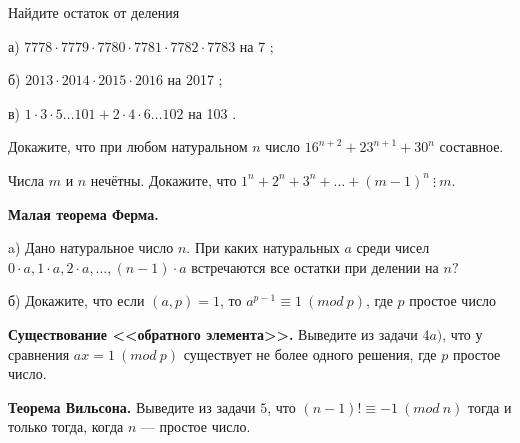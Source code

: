 \hspace{3mm}


Найдите остаток от деления

а) $7778 \cdot 7779 \cdot 7780 \cdot 7781 \cdot 7782 \cdot 7783$ на 7 ;

б) $2013 \cdot 2014 \cdot 2015 \cdot 2016$ на 2017 ;

в) $1 \cdot 3 \cdot 5 \ldots 101+2 \cdot 4 \cdot 6 \ldots 102$ на 103 .


Докажите, что при любом натуральном $n$ число $16^{n+2}+23^{n+1}+30^n$ составное.

Числа $m$ и $n$ нечётны. Докажите, что $1^n+2^n+3^n+\ldots+(m-1)^n \ \vdots \ m$.

\textbf{Малая теорема Ферма.}

a) Дано натуральное число $n$. При каких натуральных $a$ среди чисел $0 \cdot a, 1 \cdot a, 2 \cdot a, \ldots,(n-1) \cdot a$ встречаются все остатки при делении на $n ?$

б) Докажите, что если $(a, p) = 1$, то $a^{p-1} \equiv 1 \ (mod \ p)$, где $p$ простое число

\textbf{Существование <<обратного элемента>>.} Выведите из задачи $4a)$, что у сравнения $ax = 1 \ (mod \ p)$ существует не более одного решения, где $p$ простое число.

\textbf{Теорема Вильсона.} Выведите из задачи $5$, что $(n-1)! \equiv -1 \ (mod \ n)$ тогда и только тогда, когда $n$ --- простое число.
